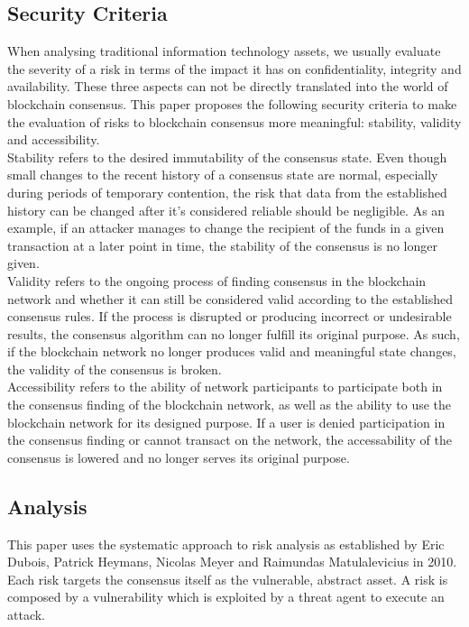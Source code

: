 \documentclass[11pt,a4paper,draft]{article}
\begin{document}
\subsection{Security Criteria}

When analysing traditional information technology assets, we usually evaluate the severity of a risk in terms of the impact it has on confidentiality, integrity and availability. These three aspects can not be directly translated into the world of blockchain consensus. This paper proposes the following security criteria to make the evaluation of risks to blockchain consensus more meaningful: stability, validity and accessibility.\\

Stability refers to the desired immutability of the consensus state. Even though small changes to the recent history of a consensus state are normal, especially during periods of temporary contention, the risk that data from the established history can be changed after it's considered reliable should be negligible. As an example, if an attacker manages to change the recipient of the funds in a given transaction at a later point in time, the stability of the consensus is no longer given.\\

Validity refers to the ongoing process of finding consensus in the blockchain network and whether it can still be considered valid according to the established consensus rules. If the process is disrupted or producing incorrect or undesirable results, the consensus algorithm can no longer fulfill its original purpose. As such, if the blockchain network no longer produces valid and meaningful state changes, the validity of the consensus is broken.\\

Accessibility refers to the ability of network participants to participate both in the consensus finding of the blockchain network, as well as the ability to use the blockchain network for its designed purpose. If a user is denied participation in the consensus finding or cannot transact on the network, the accessability of the consensus is lowered and no longer serves its original purpose.\\

\subsection{Analysis}

This paper uses the systematic approach to risk analysis as established by Eric Dubois, Patrick Heymans, Nicolas Meyer and Raimundas Matulalevicius in 2010. Each risk targets the consensus itself as the vulnerable, abstract asset. A risk is composed by a vulnerability which is exploited by a threat agent to execute an attack.\\
\end{document}
